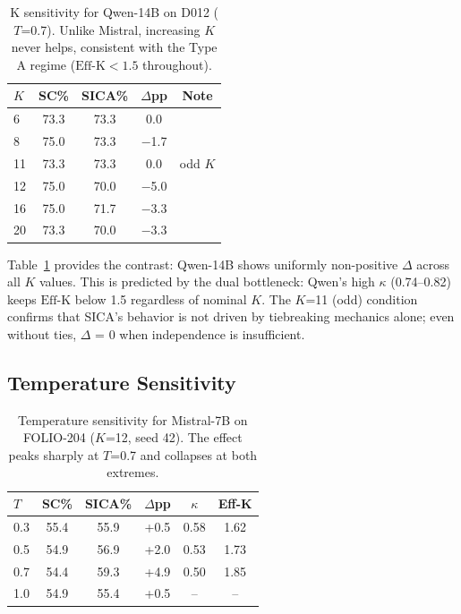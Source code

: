 \documentclass[11pt,a4paper]{article}
\newcommand{\effk}{\text{Eff-K}}
\begin{document}
\begin{table}[t]
\centering
\small
\caption{K sensitivity for Qwen-14B on D012 ($T$=0.7). Unlike Mistral, increasing $K$ never helps, consistent with the Type A regime ($\effk < 1.5$ throughout).}
\label{tab:ksens_qwen}
\begin{tabular}{lcccc}
\toprule
\textbf{$K$} & \textbf{SC\%} & \textbf{SICA\%} & \textbf{$\Delta$pp} & \textbf{Note} \\
\midrule
6 & 73.3 & 73.3 & 0.0 & \\
8 & 75.0 & 73.3 & $-$1.7 & \\
11 & 73.3 & 73.3 & 0.0 & odd $K$ \\
12 & 75.0 & 70.0 & $-$5.0 & \\
16 & 75.0 & 71.7 & $-$3.3 & \\
20 & 73.3 & 70.0 & $-$3.3 & \\
\bottomrule
\end{tabular}
\end{table}

Table~\ref{tab:ksens_qwen} provides the contrast: Qwen-14B shows uniformly non-positive $\Delta$ across all $K$ values. This is predicted by the dual bottleneck: Qwen's high $\kappa$ (0.74--0.82) keeps $\effk$ below 1.5 regardless of nominal $K$. The $K$=11 (odd) condition confirms that SICA's behavior is not driven by tiebreaking mechanics alone; even without ties, $\Delta$ = 0 when independence is insufficient.

\subsection{Temperature Sensitivity}

\begin{table}[t]
\centering
\small
\caption{Temperature sensitivity for Mistral-7B on FOLIO-204 ($K$=12, seed 42). The effect peaks sharply at $T$=0.7 and collapses at both extremes.}
\label{tab:tsens}
\begin{tabular}{lccccc}
\toprule
\textbf{$T$} & \textbf{SC\%} & \textbf{SICA\%} & \textbf{$\Delta$pp} & \textbf{$\kappa$} & \textbf{Eff-K} \\
\midrule
0.3 & 55.4 & 55.9 & +0.5 & 0.58 & 1.62 \\
0.5 & 54.9 & 56.9 & +2.0 & 0.53 & 1.73 \\
0.7 & 54.4 & 59.3 & +4.9 & 0.50 & 1.85 \\
1.0 & 54.9 & 55.4 & +0.5 & -- & -- \\
\bottomrule
\end{tabular}
\end{table}
\end{document}
